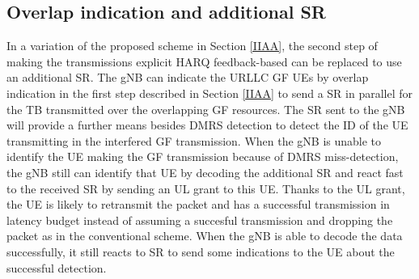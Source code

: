 \documentclass[conference]{IEEEtran}
\begin{document}

\subsection{Overlap indication and additional SR}\label{IIBB}
In a variation of the proposed scheme in Section \ref{IIAA}, the second step of making the transmissions explicit HARQ feedback-based can be replaced to use an additional SR. The gNB can indicate the URLLC GF UEs by overlap indication in the first step described in Section \ref{IIAA} to send a SR in parallel for the TB transmitted over the overlapping GF resources. The SR sent to the gNB will provide a further means besides DMRS detection to detect the ID of the UE transmitting in the interfered GF transmission. When the gNB is unable to identify the UE making the GF transmission because of DMRS miss-detection, the gNB still can identify that UE by decoding the additional SR and react fast to the received SR by sending an UL grant to this UE. Thanks to the UL grant, the UE is likely to retransmit the packet and has a successful transmission in latency budget instead of assuming a succesful transmission and dropping the packet as in the conventional scheme. When the gNB is able to decode the data successfully, it still reacts to SR to send some indications to the UE about the successful detection.  
\end{document}
